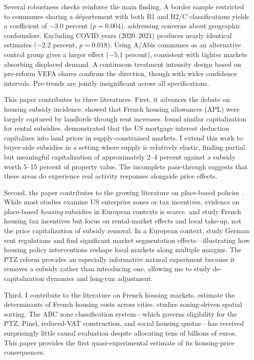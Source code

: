 \documentclass[12pt]{article}
\begin{document}
Several robustness checks reinforce the main finding. A border sample restricted to communes sharing a d\'{e}partement with both B1 and B2/C classifications yields a coefficient of $-3.0$ percent ($p=0.004$), addressing concerns about geographic confounders. Excluding COVID years (2020--2021) produces nearly identical estimates ($-2.2$ percent, $p=0.018$). Using A/Abis communes as an alternative control group gives a larger effect ($-5.1$ percent), consistent with tighter markets absorbing displaced demand. A continuous treatment intensity design based on pre-reform VEFA shares confirms the direction, though with wider confidence intervals. Pre-trends are jointly insignificant across all specifications.

This paper contributes to three literatures. First, it advances the debate on housing subsidy incidence. \citet{fack2006} showed that French housing allowances (APL) were largely captured by landlords through rent increases. \citet{laferrere2009} found similar capitalization for rental subsidies. \citet{hilber2014} demonstrated that the US mortgage interest deduction capitalizes into land prices in supply-constrained markets. I extend this work to buyer-side subsidies in a setting where supply is relatively elastic, finding partial but meaningful capitalization of approximately 2--4 percent against a subsidy worth 5--15 percent of property value. The incomplete pass-through suggests that these areas do experience real activity responses alongside price effects.

Second, the paper contributes to the growing literature on place-based policies \citep{kline2013, busso2013, neumark2015, gaubert2023}. While most studies examine US enterprise zones or tax incentives, evidence on place-based \textit{housing} subsidies in European contexts is scarce. \citet{grislain2020} and \citet{bono2023} study French housing tax incentives but focus on rental-market effects and local take-up, not the price capitalization of subsidy removal. In a European context, \citet{mense2023} study German rent regulations and find significant market segmentation effects---illustrating how housing policy interventions reshape local markets along multiple margins. The PTZ reform provides an especially informative natural experiment because it removes a subsidy rather than introducing one, allowing me to study de-capitalization dynamics and long-run adjustment.

Third, I contribute to the literature on French housing markets. \citet{combes2018} estimate the determinants of French housing costs across cities. \citet{trevien2019} studies zoning-driven spatial sorting. The ABC zone classification system---which governs eligibility for the PTZ, Pinel, reduced-VAT construction, and social housing quotas---has received surprisingly little causal evaluation despite allocating tens of billions of euros. This paper provides the first quasi-experimental estimate of its housing-price consequences.
\end{document}

